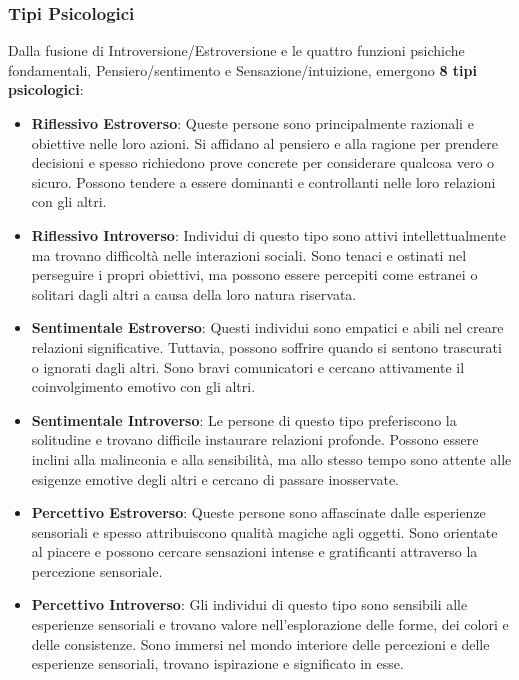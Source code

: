 \documentclass{subfiles}\
\begin{document}
\subsubsection{Tipi Psicologici}

Dalla fusione di Introversione/Estroversione e le quattro funzioni psichiche fondamentali, 
Pensiero/sentimento e Sensazione/intuizione, emergono \textbf{8 tipi psicologici}:

\begin{itemize}
    \item \textbf{Riflessivo Estroverso}: Queste persone sono principalmente razionali e obiettive 
    nelle loro azioni. Si affidano al pensiero e alla ragione per prendere decisioni e spesso 
    richiedono prove concrete per considerare qualcosa vero o sicuro. 
    Possono tendere a essere dominanti e controllanti nelle loro relazioni con gli altri.

    \item \textbf{Riflessivo Introverso}: Individui di questo tipo sono attivi intellettualmente 
    ma trovano difficoltà nelle interazioni sociali. Sono tenaci e ostinati nel perseguire i 
    propri obiettivi, ma possono essere percepiti come estranei o solitari dagli altri a causa 
    della loro natura riservata.

    \item \textbf{Sentimentale Estroverso}: Questi individui sono empatici e abili nel creare 
    relazioni significative. Tuttavia, possono soffrire quando si sentono trascurati o ignorati 
    dagli altri. Sono bravi comunicatori e cercano attivamente il coinvolgimento emotivo con gli altri.

    \item \textbf{Sentimentale Introverso}: Le persone di questo tipo preferiscono la solitudine 
    e trovano difficile instaurare relazioni profonde. Possono essere inclini alla malinconia e 
    alla sensibilità, ma allo stesso tempo sono attente alle esigenze emotive degli altri e 
    cercano di passare inosservate.

    \item \textbf{Percettivo Estroverso}: Queste persone sono affascinate dalle esperienze 
    sensoriali e spesso attribuiscono qualità magiche agli oggetti. Sono orientate al piacere 
    e possono cercare sensazioni intense e gratificanti attraverso la percezione sensoriale.

    \item \textbf{Percettivo Introverso}: Gli individui di questo tipo sono sensibili alle 
    esperienze sensoriali e trovano valore nell'esplorazione delle forme, dei colori e delle 
    consistenze. Sono immersi nel mondo interiore delle percezioni e delle esperienze sensoriali, 
    trovano ispirazione e significato in esse.


\end{itemize}
\end{document}
